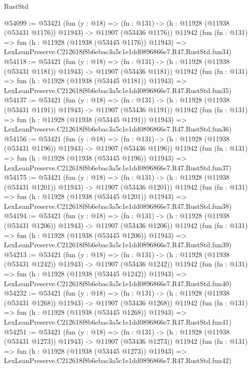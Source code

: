 \begin{lexlean}{RustStd}
\begin{coremodule}
@54099 := @53421
    (fun (y : @18) =>
    (fn : @131) -> (h : @11928 (@11938 (@53431 @1176)) @11943) -> @11907 (@53436 @1176))
    @11942
    (fun (fn : @131) =>
    fun (h : @11928 (@11938 (@53445 @1176)) @11943) =>
    LexLeanPreserve.C212618f8b6ebac3a5c1e1dd0896866e7.R47.RustStd.fun34)
@54118 := @53421
    (fun (y : @18) =>
    (fn : @131) -> (h : @11928 (@11938 (@53431 @1181)) @11943) -> @11907 (@53436 @1181))
    @11942
    (fun (fn : @131) =>
    fun (h : @11928 (@11938 (@53445 @1181)) @11943) =>
    LexLeanPreserve.C212618f8b6ebac3a5c1e1dd0896866e7.R47.RustStd.fun35)
@54137 := @53421
    (fun (y : @18) =>
    (fn : @131) -> (h : @11928 (@11938 (@53431 @1191)) @11943) -> @11907 (@53436 @1191))
    @11942
    (fun (fn : @131) =>
    fun (h : @11928 (@11938 (@53445 @1191)) @11943) =>
    LexLeanPreserve.C212618f8b6ebac3a5c1e1dd0896866e7.R47.RustStd.fun36)
@54156 := @53421
    (fun (y : @18) =>
    (fn : @131) -> (h : @11928 (@11938 (@53431 @1196)) @11943) -> @11907 (@53436 @1196))
    @11942
    (fun (fn : @131) =>
    fun (h : @11928 (@11938 (@53445 @1196)) @11943) =>
    LexLeanPreserve.C212618f8b6ebac3a5c1e1dd0896866e7.R47.RustStd.fun37)
@54175 := @53421
    (fun (y : @18) =>
    (fn : @131) -> (h : @11928 (@11938 (@53431 @1201)) @11943) -> @11907 (@53436 @1201))
    @11942
    (fun (fn : @131) =>
    fun (h : @11928 (@11938 (@53445 @1201)) @11943) =>
    LexLeanPreserve.C212618f8b6ebac3a5c1e1dd0896866e7.R47.RustStd.fun38)
@54194 := @53421
    (fun (y : @18) =>
    (fn : @131) -> (h : @11928 (@11938 (@53431 @1206)) @11943) -> @11907 (@53436 @1206))
    @11942
    (fun (fn : @131) =>
    fun (h : @11928 (@11938 (@53445 @1206)) @11943) =>
    LexLeanPreserve.C212618f8b6ebac3a5c1e1dd0896866e7.R47.RustStd.fun39)
@54213 := @53421
    (fun (y : @18) =>
    (fn : @131) -> (h : @11928 (@11938 (@53431 @1242)) @11943) -> @11907 (@53436 @1242))
    @11942
    (fun (fn : @131) =>
    fun (h : @11928 (@11938 (@53445 @1242)) @11943) =>
    LexLeanPreserve.C212618f8b6ebac3a5c1e1dd0896866e7.R47.RustStd.fun40)
@54232 := @53421
    (fun (y : @18) =>
    (fn : @131) -> (h : @11928 (@11938 (@53431 @1268)) @11943) -> @11907 (@53436 @1268))
    @11942
    (fun (fn : @131) =>
    fun (h : @11928 (@11938 (@53445 @1268)) @11943) =>
    LexLeanPreserve.C212618f8b6ebac3a5c1e1dd0896866e7.R47.RustStd.fun41)
@54251 := @53421
    (fun (y : @18) =>
    (fn : @131) -> (h : @11928 (@11938 (@53431 @1273)) @11943) -> @11907 (@53436 @1273))
    @11942
    (fun (fn : @131) =>
    fun (h : @11928 (@11938 (@53445 @1273)) @11943) =>
    LexLeanPreserve.C212618f8b6ebac3a5c1e1dd0896866e7.R47.RustStd.fun42)

\end{coremodule}
\end{lexlean}
